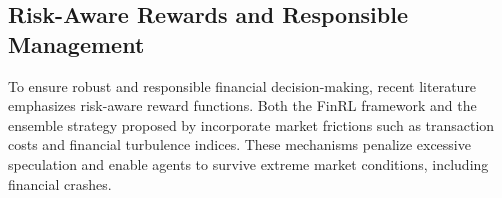 \documentclass[final]{article}
\begin{document}
\subsection{Risk-Aware Rewards and Responsible Management}

To ensure robust and responsible financial decision-making, recent literature emphasizes risk-aware reward functions. Both the FinRL framework \citep{liu2020finrl} and the ensemble strategy proposed by \citet{yang2025ensemble} incorporate market frictions such as transaction costs and financial turbulence indices. These mechanisms penalize excessive speculation and enable agents to survive extreme market conditions, including financial crashes.





\end{document}
